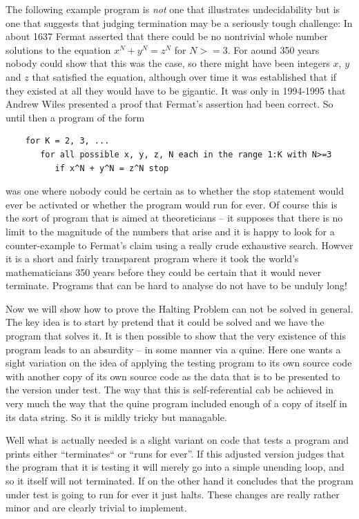 The following example program is {\em not} one that illustrates undecidability
but is one that suggests that judging termination may be a seriously tough
challenge: In about 1637 Fermat asserted that there could be no nontrivial
whole number solutions to the equation $x^N + y^N = z^N$ for $N >= 3$. For
aound 350 years nobody could show that this was the case, so there might
have been integers $x$, $y$ and $z$ that satisfied the equation, although over
time it was established that if they existed at all they would have to be
gigantic. It was only in 1994-1995 that Andrew Wiles presented a proof
that Fermat's assertion had been correct. So until then a program
of the form
\begin{verbatim}
    for K = 2, 3, ...
       for all possible x, y, z, N each in the range 1:K with N>=3
          if x^N + y^N = z^N stop
\end{verbatim}
was one where nobody could be certain as to whether the stop statement would
ever be activated or whether the program would run for ever. Of course this
is the sort of program that is aimed at theoreticians -- it supposes that
there is no limit to the magnitude of the numbers that arise and it is
happy to look for a counter-example to Fermat's claim using a really crude
exhaustive search. Howver it is a short and fairly transparent program
where it took the world's mathematicians 350 years before they could be
certain that it would never terminate. Programs that can be hard to analyse
do not have to be unduly long!

Now we will show how to prove the Halting Problem can not be solved in
general. The key idea is to start by pretend that it could be solved and
we have the program that solves it. It is then possible to show that the
very existence of this program leads to an absurdity -- in some manner
via a quine. Here one wants a sight variation on the idea of applying the
testing program to its own source code with another copy of its own source
code as the data that is to be presented to the version under test. The way
that this is self-referential cab be achieved in very much the way that the
quine program included enough of a copy of itself in its data string. So it
is mildly tricky but managable.

Well what is actually needed is a slight variant on code that tests a
program and prints either ``terminates`` or ``runs for ever''. If
this adjusted version judges that the program that it is testing it
will merely go into a simple unending loop, and so it itself will not
terminated. If on the other hand it concludes that the program under test
is going to run for ever it just halts. These changes are really rather minor
and are clearly trivial to implement.

